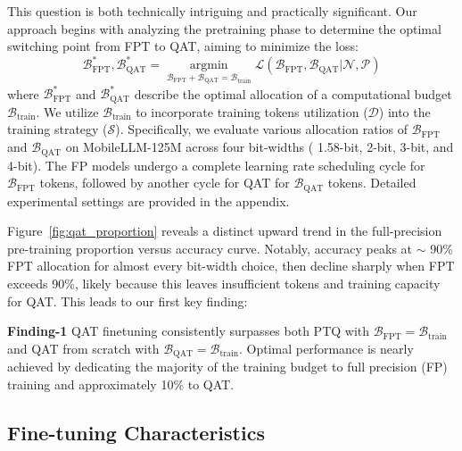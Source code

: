 This question is both technically intriguing and practically significant. Our approach begins with analyzing the pretraining phase to determine the optimal switching point from FPT to QAT, aiming to minimize the loss:
\begin{equation}
    \mathcal{B}_\text{FPT}^*, \mathcal{B}_\text{QAT}^* = \mathop{\arg \min}\limits_{\mathcal{B}_{\text{FPT}} + \mathcal{B}_{\text{QAT}}=\mathcal{B}_{\text{train}}} \mathcal{L}(\mathcal{B}_{\text{FPT}}, \mathcal{B}_{\text{QAT}} | \mathcal{N}, \mathcal{P})
\end{equation}
where $\mathcal{B}_\text{FPT}^*$ and $\mathcal{B}_\text{QAT}^*$ describe the optimal allocation of a computational budget $\mathcal{B}_{\text{train}}$. We utilize $\mathcal{B}_{\text{train}}$ to incorporate training tokens utilization ($\mathcal{D}$) into the training strategy ($\mathcal{S}$). 
Specifically, we evaluate various allocation ratios of \(\mathcal{B}_{\text{FPT}}\) and \(\mathcal{B}_{\text{QAT}}\) on MobileLLM-125M across four bit-widths ( 1.58-bit, 2-bit, 3-bit, and 4-bit). The FP models undergo a complete learning rate scheduling cycle for \(\mathcal{B}_{\text{FPT}}\) tokens, followed by another cycle for QAT for \(\mathcal{B}_{\text{QAT}}\) tokens. Detailed experimental settings are provided in the appendix.

Figure~\ref{fig:qat_proportion} reveals a distinct upward trend in the full-precision pre-training proportion versus accuracy curve. Notably, accuracy peaks at $\sim$ 90\% FPT allocation for almost every bit-width choice, then decline sharply when FPT exceeds 90\%, likely because this leaves insufficient tokens and training capacity for QAT. This leads to our first key finding:
\begin{tcolorbox}[
  enhanced,
  colback=blue!4!white,
  boxrule=0.8 pt, 
  boxsep=0pt, 
  left=2pt, 
right=2pt, 
  top=2pt,
  bottom=2pt, 
  drop fuzzy shadow=black!50
]
\textbf{Finding-1} QAT finetuning consistently surpasses both PTQ with $\mathcal{B}_\text{FPT} = \mathcal{B}_\text{train}$ and QAT from scratch with $\mathcal{B}_\text{QAT} = \mathcal{B}_\text{train}$. Optimal performance is nearly achieved by dedicating the majority of the training budget to full precision (FP) training and approximately 10\% to QAT.

\end{tcolorbox}


\subsection{Fine-tuning Characteristics}


